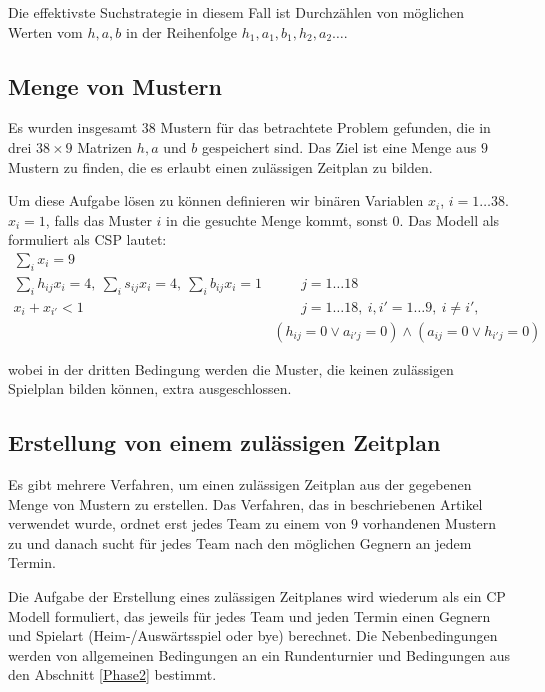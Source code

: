 Die effektivste Suchstrategie in diesem Fall ist Durchzählen von möglichen Werten vom $h,a,b$ in der Reihenfolge $h_1,a_1,b_1,h_2,a_2\dots$.

\subsection{Menge von Mustern}

Es wurden insgesamt $38$ Mustern für das betrachtete Problem gefunden, die in drei $38\times 9$ Matrizen $h,a$ und $b$ gespeichert sind. Das Ziel ist eine Menge aus $9$ Mustern zu finden, die es erlaubt einen zulässigen Zeitplan zu bilden.

Um diese Aufgabe lösen zu können definieren wir binären Variablen $x_i$, $i=1\dots 38$. $x_i=1$, falls das Muster $i$ in die gesuchte Menge kommt, sonst $0$.
Das Modell als formuliert als CSP lautet:
\begin{align}
  \sum_{i}x_i=9 &  \nonumber \\
  \sum_{i}h_{ij}x_i = 4,\ \sum_{i}s_{ij}x_i = 4,\ \sum_{i}b_{ij}x_i = 1 &\qquad  j=1\dots 18 \nonumber \\
  x_i+x_{i'} <1  &\qquad  j=1\dots 18,\ i,i'=1\dots 9,\ i\not=i', \nonumber\\
  & (h_{ij}=0 \vee a_{i'j}=0)\wedge(a_{ij}=0 \vee h_{i'j}=0) \nonumber  
\end{align}

wobei in der dritten Bedingung werden die Muster, die keinen zulässigen Spielplan bilden können, extra ausgeschlossen.

\subsection{Erstellung von einem zulässigen Zeitplan}
Es gibt mehrere Verfahren, um einen zulässigen Zeitplan aus der gegebenen Menge von Mustern zu erstellen. Das Verfahren, das in beschriebenen Artikel verwendet wurde, ordnet erst jedes Team zu einem von $9$ vorhandenen Mustern zu und danach sucht für jedes Team nach den möglichen Gegnern an jedem Termin.

Die Aufgabe der Erstellung eines zulässigen Zeitplanes wird wiederum als ein CP Modell formuliert, das jeweils für jedes Team und jeden Termin einen Gegnern und Spielart (Heim-/Auswärtsspiel oder bye) berechnet. Die Nebenbedingungen werden von allgemeinen Bedingungen an ein Rundenturnier und Bedingungen aus den Abschnitt \ref{Phase2} bestimmt.